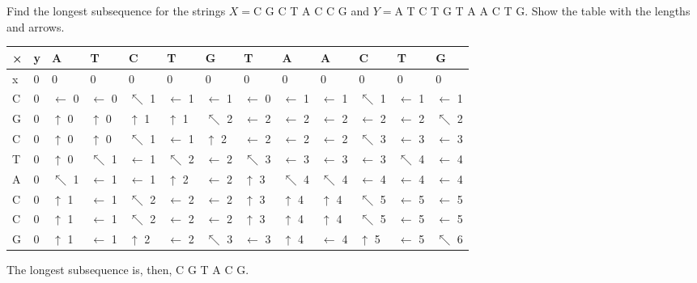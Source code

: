 \documentclass[12pt,letterpaper,twoside]{hmcpset}
\begin{document}
\begin{problem}[1]
 Find the longest subsequence for the strings $X = $C G C T A C C G and $Y =$A T C T G T A A C T G.  Show the table with the lengths and arrows.
\end{problem}

\begin{solution}
 \begin{center}
\begin{tabular}[c]{|l|l|l|l|l|l|l|l|l|l|l|l|l|}\hline
× & y & A & T & C & T & G & T & A & A & C & T & G\\\hline
x & 0 & 0 & 0 & 0 & 0 & 0 & 0 & 0 & 0 & 0 & 0 & 0\\\hline
C & 0 & $\leftarrow$ 0 & $\leftarrow$ 0 & $\nwarrow$ 1 & $\leftarrow$ 1 & $\leftarrow$ 1 & $\leftarrow$ 0 & $\leftarrow$ 1 & $\leftarrow$ 1 & $\nwarrow$ 1 & $\leftarrow$ 1  & $\leftarrow$ 1 \\\hline
G & 0 & $\uparrow$ 0 & $\uparrow$ 0 & $\uparrow$ 1 & $\uparrow$ 1 & $\nwarrow$ 2 & $\leftarrow$ 2 & $\leftarrow$ 2 & $\leftarrow$ 2 & $\leftarrow$ 2 & $\leftarrow$ 2 & $\nwarrow$ 2\\\hline
C & 0 & $\uparrow$ 0 & $\uparrow$ 0 & $\nwarrow$ 1 & $\leftarrow$ 1 & $\uparrow$ 2  & $\leftarrow$ 2 & $\leftarrow$ 2 & $\leftarrow$ 2 & $\nwarrow$ 3 & $\leftarrow$ 3 & $\leftarrow$ 3\\\hline
T & 0 & $\uparrow$ 0 & $\nwarrow$ 1 & $\leftarrow$ 1 & $\nwarrow$ 2 & $\leftarrow$ 2 & $\nwarrow$ 3 & $\leftarrow$ 3 & $\leftarrow$ 3  & $\leftarrow$ 3  & $\nwarrow$ 4 & $\leftarrow$ 4\\\hline
A & 0 & $\nwarrow$ 1 & $\leftarrow$ 1 & $\leftarrow$ 1 & $\uparrow$ 2 & $\leftarrow$ 2 & $\uparrow$ 3 & $\nwarrow$ 4 & $\nwarrow$ 4 & $\leftarrow$ 4 & $\leftarrow$ 4 & $\leftarrow$ 4\\\hline
C & 0 & $\uparrow$ 1 & $\leftarrow$ 1 & $\nwarrow$ 2 & $\leftarrow$ 2 & $\leftarrow$ 2 & $\uparrow$ 3 & $\uparrow$ 4 & $\uparrow$ 4 & $\nwarrow$ 5 & $\leftarrow$ 5 & $\leftarrow$ 5\\\hline
C & 0 & $\uparrow$ 1 & $\leftarrow$ 1 & $\nwarrow$ 2 & $\leftarrow$ 2 & $\leftarrow$ 2 & $\uparrow$ 3 & $\uparrow$ 4 & $\uparrow$ 4 & $\nwarrow$ 5 & $\leftarrow$ 5 & $\leftarrow$ 5\\\hline
G & 0 & $\uparrow$ 1 & $\leftarrow$ 1  & $\uparrow$ 2 & $\leftarrow$ 2 & $\nwarrow$ 3 & $\leftarrow$ 3 & $\uparrow$ 4 & $\leftarrow$ 4 & $\uparrow$ 5 & $\leftarrow$ 5 & $\nwarrow$ 6\\\hline
 \end{tabular}
 \end{center}


The longest subsequence is, then, C G T A C G.
\end{solution}
\end{document}
